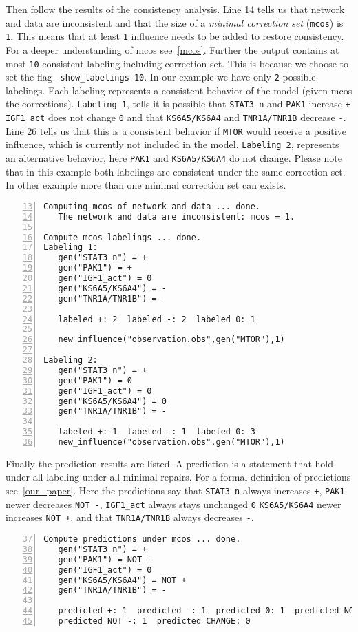 \documentclass{article}
\begin{document}
Then follow the results of the consistency analysis.
Line 14 tells us that network and data are inconsistent 
and that the size of a \emph{minimal correction set} (\texttt{mcos}) is \texttt{1}.
This means that at least \texttt{1} influence needs to be added to restore consistency.
For a deeper understanding of mcos see~\ref{mcos}.
Further the output contains at most \texttt{10} consistent labeling including correction set. 
This is because we choose to set the flag \texttt{--show\_labelings 10}.
In our example we have only \texttt{2} possible labelings. 
Each labeling represents a consistent behavior of the model (given mcos the corrections).
\texttt{Labeling 1},
tells it is possible that 
\texttt{STAT3\_n} and \texttt{PAK1} increase \texttt{+}
\texttt{IGF1\_act} does not change \texttt{0} and that
\texttt{KS6A5/KS6A4} and \texttt{TNR1A/TNR1B} decrease \texttt{-}.
Line 26 tells us that this is a consistent behavior if \texttt{MTOR} would receive a positive influence, 
which is currently not included in the model.
\texttt{Labeling 2}, represents an alternative behavior,
 here  \texttt{PAK1} and \texttt{KS6A5/KS6A4} do not change.
Please note that in this example both labelings are consistent under the same correction set.
In other example more than one minimal correction set can exists.

\begin{Verbatim}[frame=single,numbers=left,firstnumber=13]  
Computing mcos of network and data ... done.
   The network and data are inconsistent: mcos = 1.
  
Compute mcos labelings ... done.
Labeling 1:
   gen("STAT3_n") = +
   gen("PAK1") = +
   gen("IGF1_act") = 0
   gen("KS6A5/KS6A4") = -
   gen("TNR1A/TNR1B") = -

   labeled +: 2  labeled -: 2  labeled 0: 1 

   new_influence("observation.obs",gen("MTOR"),1)
   
Labeling 2:
   gen("STAT3_n") = +
   gen("PAK1") = 0
   gen("IGF1_act") = 0
   gen("KS6A5/KS6A4") = 0
   gen("TNR1A/TNR1B") = -

   labeled +: 1  labeled -: 1  labeled 0: 3 
   new_influence("observation.obs",gen("MTOR"),1)
\end{Verbatim}

Finally the prediction results are listed.
A prediction is a statement that hold under all labeling under all minimal repairs. 
For a formal definition of predictions see~\ref{our_paper}.
Here the predictions say that 
\texttt{STAT3\_n} always increases \texttt{+},
\texttt{PAK1} newer decreases \texttt{NOT -},
\texttt{IGF1\_act} always stays unchanged \texttt{0}
\texttt{KS6A5/KS6A4} newer increases \texttt{NOT +}, and that
\texttt{TNR1A/TNR1B} always decreases \texttt{-}.

\begin{Verbatim}[frame=single,numbers=left,firstnumber=37]  
Compute predictions under mcos ... done.
   gen("STAT3_n") = +
   gen("PAK1") = NOT -
   gen("IGF1_act") = 0
   gen("KS6A5/KS6A4") = NOT +
   gen("TNR1A/TNR1B") = -
 
   predicted +: 1  predicted -: 1  predicted 0: 1  predicted NOT +: 1  
   predicted NOT -: 1  predicted CHANGE: 0
\end{Verbatim}  
 
\end{document}
